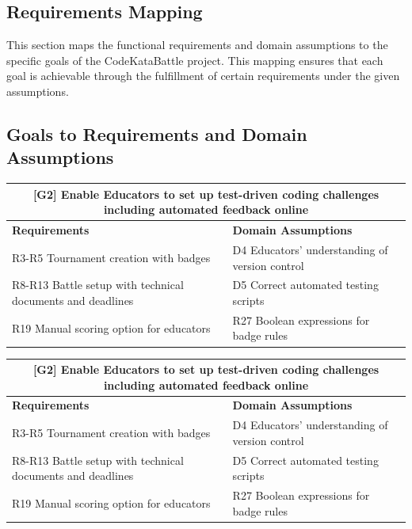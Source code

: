 \subsection{Requirements Mapping}
\label{sec:requirements_mapping}

This section maps the functional requirements and domain assumptions to the specific goals of the CodeKataBattle project. This mapping ensures that each goal is achievable through the fulfillment of certain requirements under the given assumptions.

\subsection{Goals to Requirements and Domain Assumptions}


\begin{longtable}{|p{}|p{}|}
\hline
\multicolumn{2}{|c|}{\begin{minipage}{0.9\textwidth}
\centering
\vspace{5pt}
\textbf{[G2] Enable Educators to set up test-driven coding challenges including automated feedback online}
\vspace{5pt}
\end{minipage}} \\
\hline
\textbf{Requirements} & \textbf{Domain Assumptions} \\
\hline
R3-R5 Tournament creation with badges & D4 Educators' understanding of version control \\
R8-R13 Battle setup with technical documents and deadlines & D5 Correct automated testing scripts \\
R19 Manual scoring option for educators & R27 Boolean expressions for badge rules \\
\hline
\end{longtable}

\begin{longtable}{|p{}|p{}|}
\hline
\multicolumn{2}{|c|}{\begin{minipage}{0.9\textwidth}
\centering
\vspace{5pt}
\textbf{[G2] Enable Educators to set up test-driven coding challenges including automated feedback online}
\vspace{5pt}
\end{minipage}} \\
\hline
\textbf{Requirements} & \textbf{Domain Assumptions} \\
\hline
R3-R5 Tournament creation with badges & D4 Educators' understanding of version control \\
R8-R13 Battle setup with technical documents and deadlines & D5 Correct automated testing scripts \\
R19 Manual scoring option for educators & R27 Boolean expressions for badge rules \\
\hline
\end{longtable}


